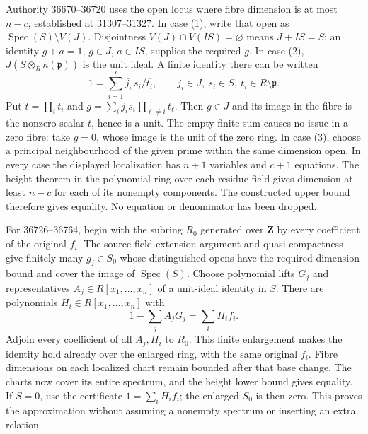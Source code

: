 Authority 36670--36720 uses the open locus where fibre dimension is at most \(n-c\), established at 31307--31327. In case (1), write that open as \(\operatorname{Spec}(S)\setminus V(J)\). Disjointness \(V(J)\cap V(IS)=\varnothing\) means \(J+IS=S\); an identity \(g+a=1\), \(g\in J\), \(a\in IS\), supplies the required \(g\). In case (2), \(J(S\otimes_R\kappa(\mathfrak p))\) is the unit ideal. A finite identity there can be written \[
1=\sum_{i=1}^r \overline{j_i}\,\overline{s_i}/\overline{t_i},
\qquad j_i\in J,\ s_i\in S,\ t_i\in R\setminus\mathfrak p.
\] Put \(t=\prod_i t_i\) and \(g=\sum_i j_i s_i\prod_{\ell\ne i}t_\ell\). Then \(g\in J\) and its image in the fibre is the nonzero scalar \(\overline t\), hence is a unit. The empty finite sum causes no issue in a zero fibre: take \(g=0\), whose image is the unit of the zero ring. In case (3), choose a principal neighbourhood of the given prime within the same dimension open. In every case the displayed localization has \(n+1\) variables and \(c+1\) equations. The height theorem in the polynomial ring over each residue field gives dimension at least \(n-c\) for each of its nonempty components. The constructed upper bound therefore gives equality. No equation or denominator has been dropped.

For 36726--36764, begin with the subring \(R_0\) generated over \(\mathbf Z\) by every coefficient of the original \(f_i\). The source field-extension argument and quasi-compactness give finitely many \(g_j\in S_0\) whose distinguished opens have the required dimension bound and cover the image of \(\operatorname{Spec}(S)\). Choose polynomial lifts \(G_j\) and representatives \(A_j\in R[x_1,\ldots,x_n]\) of a unit-ideal identity in \(S\). There are polynomials \(H_i\in R[x_1,\ldots,x_n]\) with \[
1-\sum_j A_jG_j=\sum_i H_i f_i.
\] Adjoin every coefficient of all \(A_j,H_i\) to \(R_0\). This finite enlargement makes the identity hold already over the enlarged ring, with the same original \(f_i\). Fibre dimensions on each localized chart remain bounded after that base change. The charts now cover its entire spectrum, and the height lower bound gives equality. If \(S=0\), use the certificate \(1=\sum_i H_i f_i\); the enlarged \(S_0\) is then zero. This proves the approximation without assuming a nonempty spectrum or inserting an extra relation.

